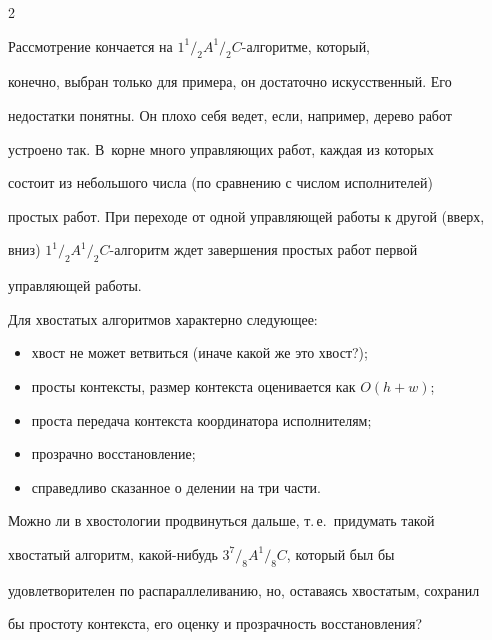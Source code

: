 \begin{multicols}{2}
      


      Рассмотрение кончается на $1^1/_2A^1/_2C$-ал\-го\-рит\-ме, который, 


конечно, выбран только для примера, он достаточно искусственный. Его 


недостатки понятны. Он плохо себя ведет, если, например, дерево работ 


устроено так. В~корне много управ\-ля\-ющих работ, каждая из которых 


состоит из небольшого чис\-ла (по сравнению с чис\-лом исполнителей) 


прос\-тых работ. При переходе от одной управ\-ля\-ющей работы к другой (вверх, 


вниз) $1^1/_2A^1/_2C$-ал\-го\-ритм ждет завершения простых работ первой 


управ\-ля\-ющей работы. 


      


      Для хвостатых алгоритмов характерно следу\-ющее:


      \begin{itemize}


\item хвост не может ветвиться (иначе какой же это хвост?);


\item просты контексты, размер контекста оценивается как $O(h+w)$;


\item проста передача контекста координатора исполнителям;


\item прозрачно восстановление;


\item справедливо сказанное о делении на три части. 


\end{itemize}


      


      Можно ли в хвостологии продвинуться дальше, т.\,е.\ придумать такой 


хвостатый алгоритм, ка\-кой-ни\-будь $3^7/_8 A^1/_8C$, который был бы 


удовлетворителен по распараллеливанию, но, оставаясь хвостатым, сохранил 


бы простоту контекста, его оценку и прозрачность восстановления?






\end{multicols}
